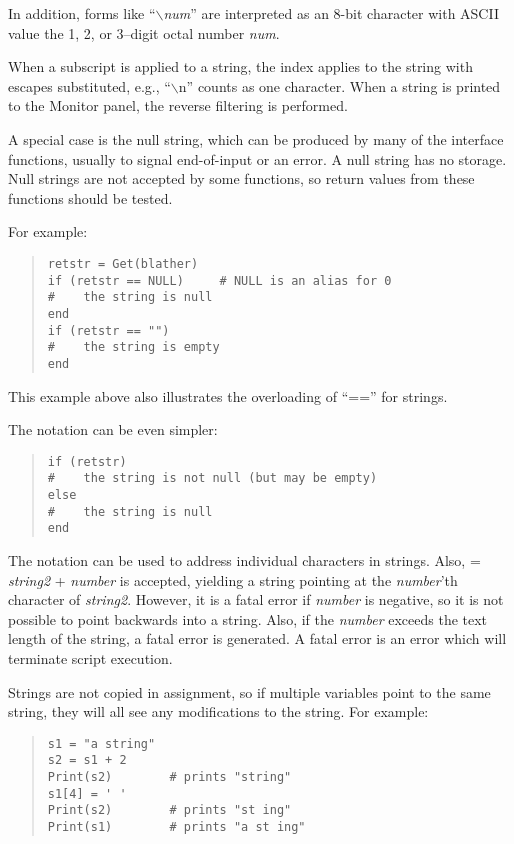 In addition, forms like ``$\backslash${\it num}'' are interpreted as
an 8-bit character with ASCII value the 1, 2, or 3--digit octal
number {\it num}.

When a subscript is applied to a string, the index applies to the
string with escapes substituted, e.g., ``$\backslash${\vt n}'' counts
as one character.  When a string is printed to the {\cb Monitor}
panel, the reverse filtering is performed.

A special case is the null string, which can be produced by many of
the interface functions, usually to signal end-of-input or an error.  A
null string has no storage.  Null strings are not accepted by some
functions, so return values from these functions should be tested.

For example:

\begin{quote}
\begin{verbatim}
retstr = Get(blather)
if (retstr == NULL)     # NULL is an alias for 0
#    the string is null
end
if (retstr == "")
#    the string is empty
end
\end{verbatim}
\end{quote}

This example above also illustrates the overloading of ``{\vt ==}''
for strings.

The notation can be even simpler:
\begin{quote}
\begin{verbatim}
if (retstr)
#    the string is not null (but may be empty)
else
#    the string is null
end
\end{verbatim}
\end{quote}

The {\vt []} notation can be used to address individual characters in
strings.  Also, { = {\it string2\/} + {\it
number\/}} is accepted, yielding a string pointing at the {\it
number\/}'th character of {\it string2\/}.  However, it is a fatal
error if {\it number} is negative, so it is not possible to point
backwards into a string.  Also, if the {\it number} exceeds the text
length of the string, a fatal error is generated.  A fatal error is an
error which will terminate script execution.

Strings are not copied in assignment, so if multiple variables
point to the same string, they will all see any modifications to
the string.  For example:
\begin{quote}
\begin{verbatim}
s1 = "a string"
s2 = s1 + 2
Print(s2)        # prints "string"
s1[4] = ' '
Print(s2)        # prints "st ing"
Print(s1)        # prints "a st ing"
\end{verbatim}
\end{quote}

